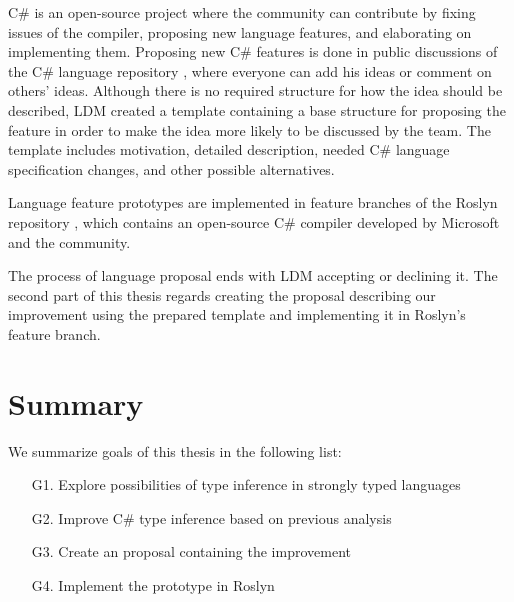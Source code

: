 C\# is an open-source project where the community can contribute by fixing issues of the compiler, proposing new language features, and elaborating on implementing them. 
Proposing new C\# features is done in public discussions of the C\# language repository \cite{online:langRepo}, where everyone can add his ideas or comment on others' ideas. 
Although there is no required structure for how the idea should be described, \ac{LDM} created a template \cite{online:proposalTemplate} containing a base structure for proposing the feature in order to make the idea more likely to be discussed by the team. 
The template includes motivation, detailed description, needed C\# language specification \cite{online:langSpec} changes, and other possible alternatives.
\par
{}
Language feature prototypes are implemented in feature branches of the Roslyn repository \cite{online:roslynRepo}, which contains an open-source C\# compiler developed by Microsoft and the community.
\par
{}
The process of language proposal ends with \ac{LDM} accepting or declining it. 
The second part of this thesis regards creating the proposal describing our improvement using the prepared template and implementing it in Roslyn’s feature branch.
\par

\section{Summary}

We summarize goals of this thesis in the following list:

\begin{enumerate}
  \item[G1.] Explore possibilities of type inference in strongly typed languages
  \item[G2.] Improve C\# type inference based on previous analysis
  \item[G3.] Create an proposal containing the improvement
  \item[G4.] Implement the prototype in Roslyn
\end{enumerate}